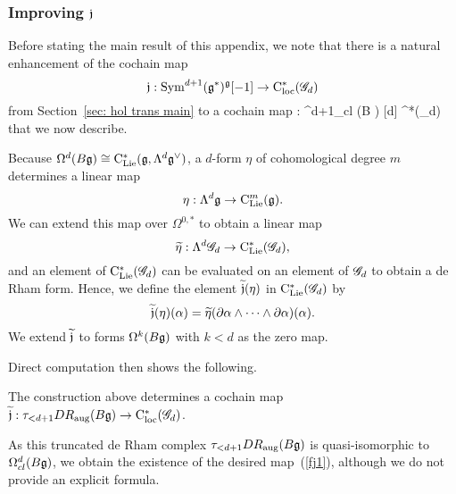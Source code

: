 \subsubsection{Improving $\mathfrak j$}

Before stating the main result of this appendix, we note that there is a natural enhancement of the cochain map
\[
\mathfrak j : {\rm Sym}^{d+1} (\mathfrak g^*)^{\mathfrak g} [-1] \to {\rm C}_{\rm loc}^*(\mathscr G_d)
\]
from Section~\ref{sec: hol trans main} to a cochain map
\beqn\label{fj1}
\fj : \Omega^{d+1}_{cl} (B \fg) [d] \to \cloc^*(\sG_d)  
\eeqn
that we now describe. 

Because $\Omega^d(B \mathfrak g) \cong {\rm C}_{{\rm Lie}}^*(\mathfrak g, \Lambda^{d} \mathfrak g^\vee)$, 
a $d$-form $\eta$ of cohomological degree $m$ determines a linear map
\[
\eta: \Lambda^d \mathfrak g \to {\rm C}_{{\rm Lie}}^m(\mathfrak g).
\]
We can extend this map over $\Omega^{0,*}$ to obtain a linear map
\[
\widetilde{\eta}: \Lambda^d \mathscr G_d \to {\rm C}_{{\rm Lie}}^*(\mathscr G_d),
\]
and an element of ${\rm C}_{{\rm Lie}}^*(\mathscr G_d)$ can be evaluated on an element of $\mathscr G_d$ to obtain a de Rham form.
Hence, we define the element $\widetilde{\mathfrak j}(\eta)$ in ${\rm C}_{{\rm Lie}}^*(\mathscr G_d)$ by 
\[
\widetilde{\mathfrak j} (\eta) (\alpha) = \widetilde{\eta}(\partial \alpha \wedge \cdots \wedge \partial \alpha) (\alpha) .
\]
We extend $\widetilde{\mathfrak j}$ to forms $\Omega^k(B\mathfrak g)$ with $k < d$ as the zero map.

Direct computation then shows the following.

\begin{lem}
The construction above determines a cochain map $\widetilde{\mathfrak j}: \tau_{<d+1} DR_{\rm aug}(B\mathfrak g) \to {\rm C}_{\rm loc}^*(\mathscr G_d)$.  
\end{lem}

As this truncated de Rham complex $\tau_{<d+1} DR_{\rm aug}(B\mathfrak g)$ is quasi-isomorphic to  $\Omega^d_{cl}(B\mathfrak g)$, 
we obtain the existence of the desired map~(\ref{fj1}),
although we do not provide an explicit formula.

%

